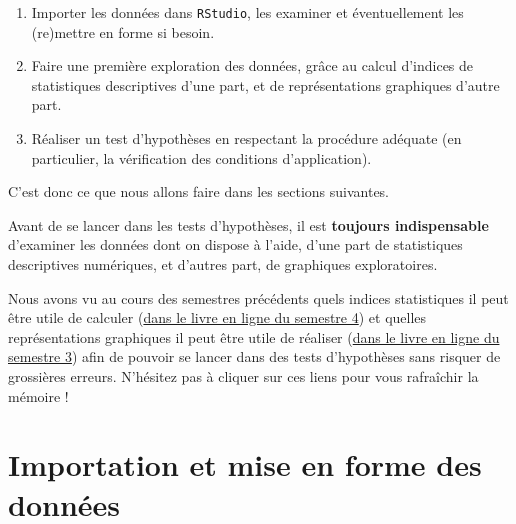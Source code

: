 \documentclass[
  a4paper,
  DIV=11,
  numbers=noendperiod,
  oneside]{scrreprt}
\providecommand{\tightlist}{%
  \setlength{\itemsep}{0pt}\setlength{\parskip}{0pt}}\usepackage{longtable,booktabs,array}
\begin{document}
\begin{enumerate}
\def\labelenumi{\arabic{enumi}.}
\tightlist
\item
  Importer les données dans \texttt{RStudio}, les examiner et
  éventuellement les (re)mettre en forme si besoin.
\item
  Faire une première exploration des données, grâce au calcul d'indices
  de statistiques descriptives d'une part, et de représentations
  graphiques d'autre part.
\item
  Réaliser un test d'hypothèses en respectant la procédure adéquate (en
  particulier, la vérification des conditions d'application).
\end{enumerate}

C'est donc ce que nous allons faire dans les sections suivantes.

\begin{tcolorbox}[enhanced jigsaw, breakable, toprule=.15mm, colbacktitle=quarto-callout-important-color!10!white, colframe=quarto-callout-important-color-frame, arc=.35mm, bottomtitle=1mm, opacityback=0, title=\textcolor{quarto-callout-important-color}{\faExclamation}\hspace{0.5em}{À retenir !}, bottomrule=.15mm, colback=white, toptitle=1mm, rightrule=.15mm, leftrule=.75mm, opacitybacktitle=0.6, left=2mm, titlerule=0mm, coltitle=black]

Avant de se lancer dans les tests d'hypothèses, il est \textbf{toujours
indispensable} d'examiner les données dont on dispose à l'aide, d'une
part de statistiques descriptives numériques, et d'autres part, de
graphiques exploratoires.

Nous avons vu au cours des semestres précédents quels indices
statistiques il peut être utile de calculer
(\href{https://besibo.github.io/BiometrieS4/01-dispersion.html}{dans le
livre en ligne du semestre 4}) et quelles représentations graphiques il
peut être utile de réaliser
(\href{https://besibo.github.io/BiometrieS3/03-visualization.html}{dans
le livre en ligne du semestre 3}) afin de pouvoir se lancer dans des
tests d'hypothèses sans risquer de grossières erreurs. N'hésitez pas à
cliquer sur ces liens pour vous rafraîchir la mémoire !

\end{tcolorbox}

\hypertarget{importation-et-mise-en-forme-des-donnuxe9es}{%
\section{Importation et mise en forme des
données}\label{importation-et-mise-en-forme-des-donnuxe9es}}
\end{document}
